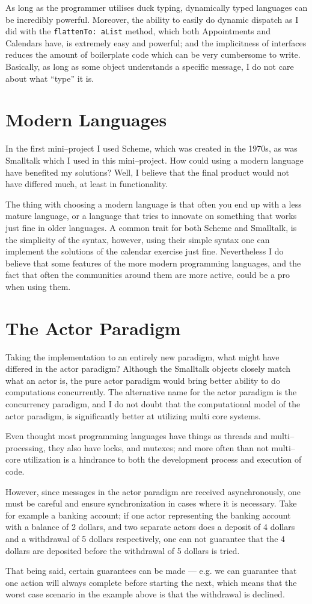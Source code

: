 As long as the programmer utilises duck typing, dynamically typed languages can be incredibly powerful.
Moreover, the ability to easily do dynamic dispatch as I did with the \texttt{flattenTo: aList} method, which both Appointments and Calendars have,
is extremely easy and powerful; and the implicitness of interfaces reduces the amount of boilerplate code which can be very cumbersome to write.
Basically, as long as some object understands a specific message, I do not care about what \enquote{type} it is.

\section{Modern Languages}
In the first mini--project I used Scheme, which was created in the 1970s, as was Smalltalk which I used in this mini--project.
How could using a modern language have benefited my solutions?
Well, I believe that the final product would not have differed much, at least in functionality.

The thing with choosing a modern language is that often you end up with a less mature language, or a language that tries to innovate on something that works just fine in older languages.
A common trait for both Scheme and Smalltalk, is the simplicity of the syntax, however, using their simple syntax one can implement the solutions of the calendar exercise just fine.
Nevertheless I do believe that some features of the more modern programming languages, and the fact that often the communities around them are more active, could be a pro when using them.

\section{The Actor Paradigm}
Taking the implementation to an entirely new paradigm, what might have differed in the actor paradigm?
Although the Smalltalk objects closely match what an actor is, the pure actor paradigm would bring better ability to do computations concurrently.
The alternative name for the actor paradigm is the concurrency paradigm, and I do not doubt that the computational model of the actor paradigm, is significantly better at utilizing multi core systems.

Even thought most programming languages have things as threads and multi--processing, they also have locks, and mutexes;
and more often than not multi--core utilization is a hindrance to both the development process and execution of code.

However, since messages in the actor paradigm are received asynchronously, one must be careful and ensure synchronization in cases where it is necessary.
Take for example a banking account; if one actor representing the banking account with a balance of 2 dollars,
and two separate actors does a deposit of 4 dollars and a withdrawal of 5 dollars respectively,
one can not guarantee that the 4 dollars are deposited before the withdrawal of 5 dollars is tried.

That being said, certain guarantees can be made --- e.g. we can guarantee that one action will always complete before starting the next,
which means that the worst case scenario in the example above is that the withdrawal is declined.
